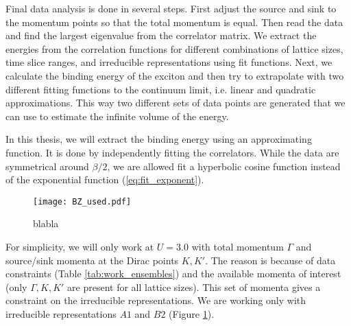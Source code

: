 
Final data analysis is done in several steps. First adjust the source and sink to the momentum points so that the total momentum is equal. Then read the data and find the largest eigenvalue from the correlator matrix. We extract the energies from the correlation functions for different combinations of lattice sizes, time slice ranges, and irreducible representations using fit functions. Next, we calculate the binding energy of the exciton and then try to extrapolate with two different fitting functions to the continuum limit, i.e. linear and quadratic approximations. This way two different sets of data points are generated that we can use to estimate the infinite volume of the energy.

In this thesis, we will extract the binding energy using an approximating function. It is done by independently fitting the correlators. While the data are symmetrical around $\beta/2$, we are allowed fit a hyperbolic cosine function instead of the exponential function (\ref{eq:fit_exponent}). 
\begin{figure}[htbp]
    \centerline{\texttt{[image: BZ\_used.pdf]}}
    \caption{blabla}
    \label{fig:used irrep}
\end{figure}
For simplicity, we will only work at $U = 3.0$ with total momentum $\Gamma$ and source/sink momenta at the Dirac points $K, K'$. The reason is because of data constraints (Table \ref{tab:work_ensembles}) and the available momenta of interest (only $\Gamma, K, K'$ are present for all lattice sizes). This set of momenta gives a constraint on the irreducible representations. We are working only with irreducible representations $A1$ and $B2$ (Figure \ref{fig:used irrep}).

